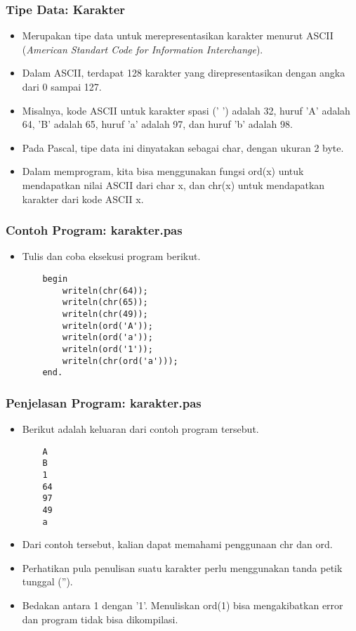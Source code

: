 \documentclass{beamer}
\begin{document}
\begin{frame}
\frametitle{Tipe Data: Karakter}
\begin{itemize}
	\item Merupakan tipe data untuk merepresentasikan karakter menurut ASCII (\textit{American Standart Code for Information Interchange}).
	\item Dalam ASCII, terdapat 128 karakter yang direpresentasikan dengan angka dari 0 sampai 127. 
	\item Misalnya, kode ASCII untuk karakter spasi (' ') adalah 32, huruf 'A' adalah 64, 'B' adalah 65, huruf 'a' adalah 97, dan huruf 'b' adalah 98.
	\item Pada Pascal, tipe data ini dinyatakan sebagai \alert{char}, dengan ukuran 2 byte.
	\item Dalam memprogram, kita bisa menggunakan fungsi ord(x) untuk mendapatkan nilai ASCII dari char x, dan chr(x) untuk mendapatkan karakter dari kode ASCII x.
\end{itemize}
\end{frame}

\begin{frame}[fragile]
\frametitle{Contoh Program: karakter.pas}
\begin{itemize}
	\item Tulis dan coba eksekusi program berikut.
	\begin{lstlisting}
	begin
	    writeln(chr(64));
	    writeln(chr(65));
	    writeln(chr(49));
	    writeln(ord('A'));
	    writeln(ord('a'));
	    writeln(ord('1'));
	    writeln(chr(ord('a')));
	end.
	\end{lstlisting}
\end{itemize}
\end{frame}

\begin{frame}[fragile]
\frametitle{Penjelasan Program: karakter.pas}
\begin{itemize}
	\item Berikut adalah keluaran dari contoh program tersebut.
	\begin{lstlisting}
	A
	B
	1
	64
	97
	49
	a
	\end{lstlisting}
	\item Dari contoh tersebut, kalian dapat memahami penggunaan chr dan ord.
	\item Perhatikan pula penulisan suatu karakter perlu menggunakan tanda petik tunggal ('').
	\item Bedakan antara 1 dengan '1'. Menuliskan ord(1) bisa mengakibatkan error dan program tidak bisa dikompilasi.
\end{itemize}
\end{frame}
\end{document}
